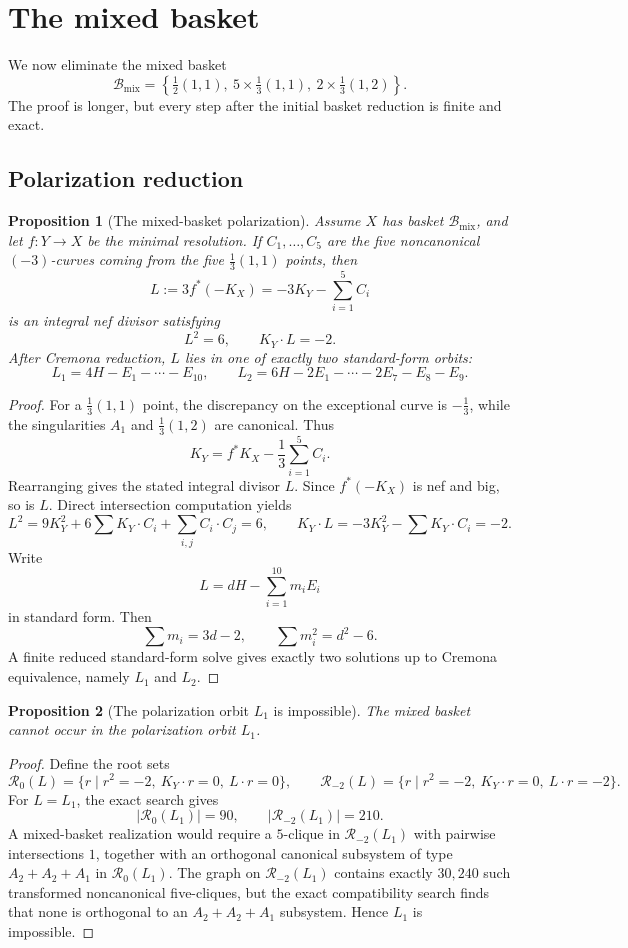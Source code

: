 \documentclass[11pt]{article}
\newtheorem{proposition}[proposition]{Proposition}
\theoremstyle{definition}
\begin{document}
\section{The mixed basket}\label{sec:mixed}
We now eliminate the mixed basket
\[
\mathcal B_{\mathrm{mix}}=\left\{\tfrac12(1,1),\ 5\times\tfrac13(1,1),\ 2\times\tfrac13(1,2)\right\}.
\]
The proof is longer, but every step after the initial basket reduction is finite and exact.

\subsection{Polarization reduction}

\begin{proposition}[The mixed-basket polarization]\label{prop:mixed-polarization}
Assume $X$ has basket $\mathcal B_{\mathrm{mix}}$, and let $f\colon Y\to X$ be the minimal resolution. If $C_1,\dots,C_5$ are the five noncanonical $(-3)$-curves coming from the five $\frac13(1,1)$ points, then
\[
L:=3f^*(-K_X)=-3K_Y-\sum_{i=1}^5C_i
\]
is an integral nef divisor satisfying
\[
L^2=6,\qquad K_Y\cdot L=-2.
\]
After Cremona reduction, $L$ lies in one of exactly two standard-form orbits:
\[
L_1=4H-E_1-\cdots-E_{10},
\qquad
L_2=6H-2E_1-\cdots-2E_7-E_8-E_9.
\]
\end{proposition}

\begin{proof}
For a $\frac13(1,1)$ point, the discrepancy on the exceptional curve is $-\frac13$, while the singularities $A_1$ and $\frac13(1,2)$ are canonical. Thus
\[
K_Y=f^*K_X-\frac13\sum_{i=1}^5C_i.
\]
Rearranging gives the stated integral divisor $L$. Since $f^*(-K_X)$ is nef and big, so is $L$. Direct intersection computation yields
\[
L^2=9K_Y^2+6\sum K_Y\cdot C_i+\sum_{i,j}C_i\cdot C_j=6,
\qquad
K_Y\cdot L=-3K_Y^2-\sum K_Y\cdot C_i=-2.
\]
Write
\[
L=dH-\sum_{i=1}^{10}m_iE_i
\]
in standard form. Then
\[
\sum m_i=3d-2,
\qquad
\sum m_i^2=d^2-6.
\]
A finite reduced standard-form solve gives exactly two solutions up to Cremona equivalence, namely $L_1$ and $L_2$.
\end{proof}

\begin{proposition}[The polarization orbit $L_1$ is impossible]\label{prop:L1-impossible}
The mixed basket cannot occur in the polarization orbit $L_1$.
\end{proposition}

\begin{proof}
Define the root sets
\[
\mathcal R_0(L)=\{r\mid r^2=-2,\ K_Y\cdot r=0,\ L\cdot r=0\},
\qquad
\mathcal R_{-2}(L)=\{r\mid r^2=-2,\ K_Y\cdot r=0,\ L\cdot r=-2\}.
\]
For $L=L_1$, the exact search gives
\[
|\mathcal R_0(L_1)|=90,
\qquad
|\mathcal R_{-2}(L_1)|=210.
\]
A mixed-basket realization would require a $5$-clique in $\mathcal R_{-2}(L_1)$ with pairwise intersections $1$, together with an orthogonal canonical subsystem of type $A_2+A_2+A_1$ in $\mathcal R_0(L_1)$. The graph on $\mathcal R_{-2}(L_1)$ contains exactly $30{,}240$ such transformed noncanonical five-cliques, but the exact compatibility search finds that none is orthogonal to an $A_2+A_2+A_1$ subsystem. Hence $L_1$ is impossible.
\end{proof}
\end{document}
